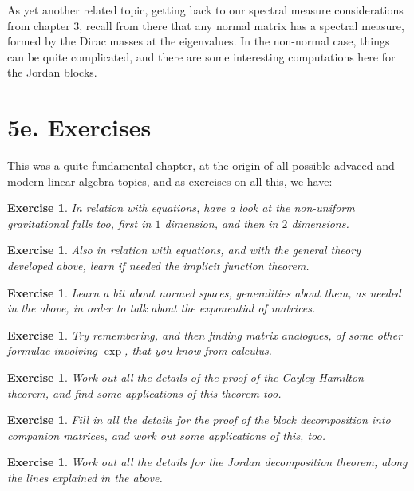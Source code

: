 \documentclass[12pt]{amsbook}
\newtheorem{exercise}[theorem]{Exercise}
\begin{document}
As yet another related topic, getting back to our spectral measure considerations from chapter 3, recall from there that any normal matrix has a spectral measure, formed by the Dirac masses at the eigenvalues. In the non-normal case, things can be quite complicated, and there are some interesting computations here for the Jordan blocks.

\section*{5e. Exercises}

This was a quite fundamental chapter, at the origin of all possible advaced and modern linear algebra topics, and as exercises on all this, we have:

\begin{exercise}
In relation with equations, have a look at the non-uniform gravitational falls too, first in $1$ dimension, and then in $2$ dimensions.
\end{exercise}

\begin{exercise}
Also in relation with equations, and with the general theory developed above, learn if needed the implicit function theorem.
\end{exercise}

\begin{exercise}
Learn a bit about normed spaces, generalities about them, as needed in the above, in order to talk about the exponential of matrices.
\end{exercise}

\begin{exercise}
Try remembering, and then finding matrix analogues, of some other formulae involving $\exp$, that you know from calculus.
\end{exercise}

\begin{exercise}
Work out all the details of the proof of the Cayley-Hamilton theorem, and find some applications of this theorem too.
\end{exercise}

\begin{exercise}
Fill in all the details for the proof of the block decomposition into companion matrices, and work out some applications of this, too.
\end{exercise}

\begin{exercise}
Work out all the details for the Jordan decomposition theorem, along the lines explained in the above.
\end{exercise}
\end{document}
